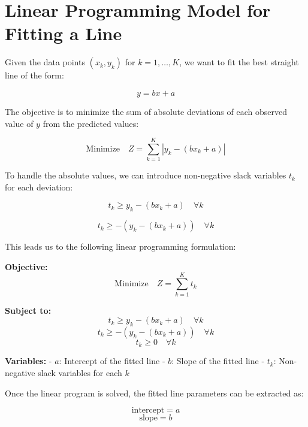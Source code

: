 \documentclass{article}
\begin{document}
\section*{Linear Programming Model for Fitting a Line}

Given the data points \( (x_k, y_k) \) for \( k = 1, \ldots, K \), we want to fit the best straight line of the form:

\[
y = bx + a
\]

The objective is to minimize the sum of absolute deviations of each observed value of \( y \) from the predicted values:

\[
\text{Minimize} \quad Z = \sum_{k=1}^{K} |y_k - (bx_k + a)|
\]

To handle the absolute values, we can introduce non-negative slack variables \( t_k \) for each deviation:

\[
t_k \geq y_k - (bx_k + a) \quad \forall k
\]

\[
t_k \geq -(y_k - (bx_k + a)) \quad \forall k
\]

This leads us to the following linear programming formulation:

\textbf{Objective:}
\[
\text{Minimize} \quad Z = \sum_{k=1}^{K} t_k
\]

\textbf{Subject to:}
\[
t_k \geq y_k - (bx_k + a) \quad \forall k
\]
\[
t_k \geq -(y_k - (bx_k + a)) \quad \forall k
\]
\[
t_k \geq 0 \quad \forall k
\]

\textbf{Variables:}
- \( a \): Intercept of the fitted line
- \( b \): Slope of the fitted line
- \( t_k \): Non-negative slack variables for each \( k \)

Once the linear program is solved, the fitted line parameters can be extracted as:

\[
\text{intercept} = a
\]
\[
\text{slope} = b
\]
\end{document}
